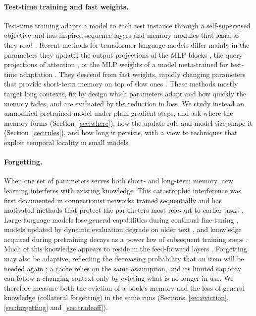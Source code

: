 \documentclass[10pt]{article}
\begin{document}
\paragraph{Test-time training and fast weights.}
Test-time training adapts a model to each test instance through a self-supervised objective \cite{sun2020test} and has inspired sequence layers and memory modules that learn as they read \cite{sun2024learning,behrouz2024titans}.
Recent methods for transformer language models differ mainly in the parameters they update: the output projections of the MLP blocks \cite{feng2026inplace}, the query projections of attention \cite{bansal2026lets}, or the MLP weights of a model meta-trained for test-time adaptation \cite{tandon2025endtoend}.
They descend from fast weights, rapidly changing parameters that provide short-term memory on top of slow ones \cite{hinton1987using,schmidhuber1992learning,ba2016using,clark2022meta}.
These methods mostly target long contexts, fix by design which parameters adapt and how quickly the memory fades, and are evaluated by the reduction in loss.
We study instead an unmodified pretrained model under plain gradient steps, and ask where the memory forms (Section~\ref{sec:where}), how the update rule and model size shape it (Section~\ref{sec:rules}), and how long it persists, with a view to techniques that exploit temporal locality in small models.

\paragraph{Forgetting.}
When one set of parameters serves both short- and long-term memory, new learning interferes with existing knowledge.
This catastrophic interference was first documented in connectionist networks trained sequentially \cite{mccloskey1989catastrophic,french1999catastrophic} and has motivated methods that protect the parameters most relevant to earlier tasks \cite{kirkpatrick2017overcoming}.
Large language models lose general capabilities during continual fine-tuning \cite{luo2023empirical}, models updated by dynamic evaluation degrade on older text \cite{lazaridou2021mind}, and knowledge acquired during pretraining decays as a power law of subsequent training steps \cite{chang2024how}.
Much of this knowledge appears to reside in the feed-forward layers \cite{geva2021transformer,meng2022locating}.
Forgetting may also be adaptive, reflecting the decreasing probability that an item will be needed again \cite{anderson1991reflections}; a cache relies on the same assumption, and its limited capacity can follow a changing context only by evicting what is no longer in use.
We therefore measure both the eviction of a book's memory and the loss of general knowledge (collateral forgetting) in the same runs (Sections~\ref{sec:eviction}, \ref{sec:forgetting} and~\ref{sec:tradeoff}).
\end{document}
